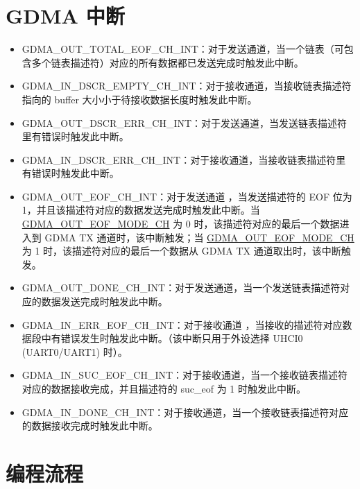 \documentclass[main\_\_CN.tex]{subfiles}
\begin{document}
\section{GDMA 中断}
\begin{itemize}
\item \label{int:GDMAOUTTOTALEOFINT}GDMA\_OUT\_TOTAL\_EOF\_CH\_INT：对于发送通道，当一个链表（可包含多个链表描述符）对应的所有数据都已发送完成时触发此中断。
\item \label{int:GDMAINDSCREMPTYINT}GDMA\_IN\_DSCR\_EMPTY\_CH\_INT：对于接收通道，当接收链表描述符指向的 buffer 大小小于待接收数据长度时触发此中断。
\item \label{int:GDMAOUTDSCRERRINT}GDMA\_OUT\_DSCR\_ERR\_CH\_INT：对于发送通道，当发送链表描述符里有错误时触发此中断。
\item \label{int:GDMAINDSCRERRINT}GDMA\_IN\_DSCR\_ERR\_CH\_INT：对于接收通道，当接收链表描述符里有错误时触发此中断。
\item \label{int:GDMAOUTEOFINT}GDMA\_OUT\_EOF\_CH\_INT：对于发送通道 ，当发送描述符的 EOF 位为 1，并且该描述符对应的数据发送完成时触发此中断。当 \hyperref[fielddesc:DMAOUTEOFMODECHN]{GDMA\_OUT\_EOF\_MODE\_CH} 为 0 时，该描述符对应的最后一个数据进入到 GDMA TX 通道时，该中断触发；当 \hyperref[fielddesc:DMAOUTEOFMODECHN]{GDMA\_OUT\_EOF\_MODE\_CH} 为 1 时，该描述符对应的最后一个数据从 GDMA TX 通道取出时，该中断触发。
\item \label{int:GDMAOUTDONEINT}GDMA\_OUT\_DONE\_CH\_INT：对于发送通道，当一个发送链表描述符对应的数据发送完成时触发此中断。
\item \label{int:GDMAINERREOFINT}GDMA\_IN\_ERR\_EOF\_CH\_INT：对于接收通道 ，当接收的描述符对应数据段中有错误发生时触发此中断。（该中断只用于外设选择 UHCI0 (UART0/UART1) 时）。
\item \label{int:GDMAINSUCEOFINT}GDMA\_IN\_SUC\_EOF\_CH\_INT：对于接收通道，当一个接收链表描述符对应的数据接收完成，并且描述符的 suc\_eof 为 1 时触发此中断。
\item \label{int:GDMAINDONEINT}GDMA\_IN\_DONE\_CH\_INT：对于接收通道，当一个接收链表描述符对应的数据接收完成时触发此中断。
\end{itemize}

\section{编程流程}
\end{document}
